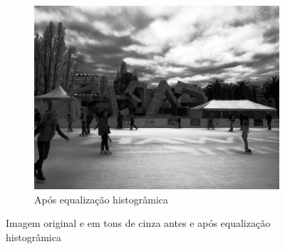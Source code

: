 \documentclass[10pt,a4paper]{article}
\begin{document}
\begin{figure}[!ht]
\begin{subfigure}[ht]{0.45\textwidth}
        \includegraphics[width=\textwidth]{dst.jpg}
        \caption{Após equalização histogrâmica}
        \label{fig:dst}
    \end{subfigure}
    \caption{Imagem original e em tons de cinza antes e após equalização histogrâmica}
\end{figure}
\end{document}
